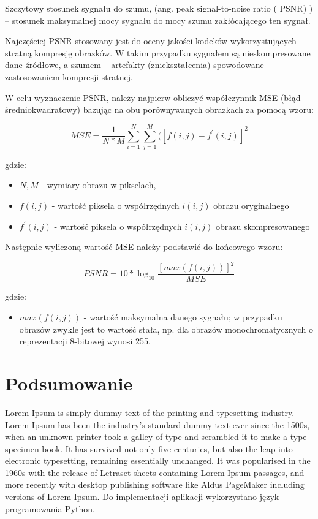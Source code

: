 \documentclass{article}
\begin{document}
Szczytowy stosunek sygnału do szumu, (ang. peak signal-to-noise ratio ( PSNR) ) – stosunek maksymalnej mocy sygnału do mocy szumu zakłócającego ten sygnał.  

Najczęściej PSNR stosowany jest do oceny jakości kodeków wykorzystujących stratną kompresję obrazków. W takim przypadku sygnałem są nieskompresowane dane źródłowe, a szumem – artefakty (zniekształcenia) spowodowane zastosowaniem kompresji stratnej. 

W celu wyznaczenie PSNR, należy najpierw obliczyć współczynnik MSE (błąd średniokwadratowy) bazując na obu porównywanych obrazkach za pomocą wzoru:

\begin{equation}
MSE = \frac{1}{N * M} \sum_{i=1}^N \sum_{j=1}^M ([f(i, j) - f^{'}(i, j)]^2
\end{equation}

gdzie:
\begin{itemize}[label=]
    \item $N, M$ - wymiary obrazu w pikselach,
    \item $f(i, j)$ - wartość piksela o współrzędnych $i(i, j)$ obrazu oryginalnego
    \item $f^{'}(i, j)$ - wartość piksela o współrzędnych $i(i, j)$ obrazu skompresowanego
\end{itemize}

Następnie wyliczoną wartość MSE należy podstawić do końcowego wzoru: 

\begin{equation}
PSNR = 10 * \log_10 \frac{[max(f(i,j))]^2}{MSE}
\end{equation}

gdzie:
\begin{itemize}[label=]
    \item $max(f(i,j))$ - wartość maksymalna danego sygnału; w przypadku obrazów zwykle jest to wartość stała, np. dla obrazów monochromatycznych o reprezentacji 8-bitowej wynosi 255.
\end{itemize}

\section{Podsumowanie}

Lorem Ipsum is simply dummy text of the printing and typesetting industry. Lorem Ipsum has been the industry's standard dummy text ever since the 1500s, when an unknown printer took a galley of type and scrambled it to make a type specimen book. It has survived not only five centuries, but also the leap into electronic typesetting, remaining essentially unchanged. It was popularised in the 1960s with the release of Letraset sheets containing Lorem Ipsum passages, and more recently with desktop publishing software like Aldus PageMaker including versions of Lorem Ipsum. Do implementacji aplikacji wykorzystano język programowania Python.
\end{document}
